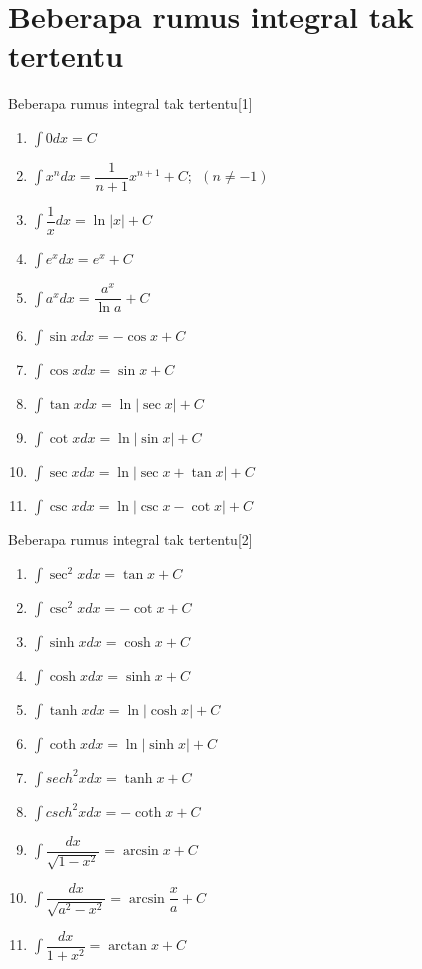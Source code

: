 \documentclass{beamer}
\newcounter{saveenumi}
\newcommand{\seti}{\setcounter{saveenumi}{\value{enumi}}}
\newcommand{\conti}{\setcounter{enumi}{\value{saveenumi}}}
\begin{document}
\section{Beberapa rumus integral tak tertentu}
\begin{frame}[t, fragile]{Beberapa rumus integral tak tertentu[1]}
\begin{enumerate}
\item $\int 0 dx= C$
\item $\int x^n dx= \dfrac{1}{n+1} x^{n+1} +C;~~(n\neq -1)$
\item $\int \dfrac{1}{x} dx = \ln |x| + C$
\item $\int e^xdx = e^x + C$
\item $\int a^x dx = \dfrac {a^x} {\ln a} + C$
\item $\int \sin x dx = - \cos x + C$
\item $\int \cos x dx = \sin x + C$
\item $\int \tan x dx = \ln | \sec x | + C$
\item $\int \cot x dx = \ln | \sin x | + C$
\item $\int \sec x dx = \ln | \sec x + \tan x | + C$
\item $\int \csc x dx = \ln | \csc x - \cot x| + C$
\seti
\end{enumerate}
\end{frame}

\begin{frame}[t, fragile]{Beberapa rumus integral tak tertentu[2]}
\begin{enumerate}
\conti
\item $\int \sec ^2 x dx = \tan x +C$
\item $\int \csc ^2 x dx = - \cot x + C$
\item $\int \sinh x dx= \cosh x + C$
\item $\int \cosh x dx= \sinh x + C$
\item $\int \tanh x dx= \ln |\cosh x| + C$
\item $\int \coth x dx= \ln |\sinh x| + C$
\item $\int sech^2 x dx= \tanh x +C$
\item $\int csch^2 x dx= - \coth x + C$
\item $\int \dfrac{dx}{\sqrt{1-x^2}} = \arcsin x + C$
\item $\int \dfrac{dx}{\sqrt{a^2-x^2}} = \arcsin \dfrac{x}{a} + C$
\item $\int \dfrac{dx}{1+x^2} = \arctan x + C$
\seti
\end{enumerate}
\end{frame}
\end{document}
